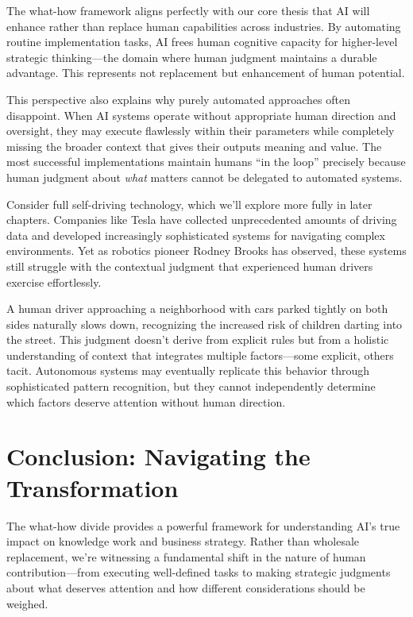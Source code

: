 \documentclass[
  Letterpaper,
]{scrbook}
\begin{document}
The what-how framework aligns perfectly with our core thesis that AI
will enhance rather than replace human capabilities across industries.
By automating routine implementation tasks, AI frees human cognitive
capacity for higher-level strategic thinking---the domain where human
judgment maintains a durable advantage. This represents not replacement
but enhancement of human potential.

This perspective also explains why purely automated approaches often
disappoint. When AI systems operate without appropriate human direction
and oversight, they may execute flawlessly within their parameters while
completely missing the broader context that gives their outputs meaning
and value. The most successful implementations maintain humans ``in the
loop'' precisely because human judgment about \emph{what} matters cannot
be delegated to automated systems.

Consider full self-driving technology, which we'll explore more fully in
later chapters. Companies like Tesla have collected unprecedented
amounts of driving data and developed increasingly sophisticated systems
for navigating complex environments. Yet as robotics pioneer Rodney
Brooks has observed, these systems still struggle with the contextual
judgment that experienced human drivers exercise effortlessly.

A human driver approaching a neighborhood with cars parked tightly on
both sides naturally slows down, recognizing the increased risk of
children darting into the street. This judgment doesn't derive from
explicit rules but from a holistic understanding of context that
integrates multiple factors---some explicit, others tacit. Autonomous
systems may eventually replicate this behavior through sophisticated
pattern recognition, but they cannot independently determine which
factors deserve attention without human direction.

\section{Conclusion: Navigating the
Transformation}\label{conclusion-navigating-the-transformation}

The what-how divide provides a powerful framework for understanding AI's
true impact on knowledge work and business strategy. Rather than
wholesale replacement, we're witnessing a fundamental shift in the
nature of human contribution---from executing well-defined tasks to
making strategic judgments about what deserves attention and how
different considerations should be weighed.
\end{document}
